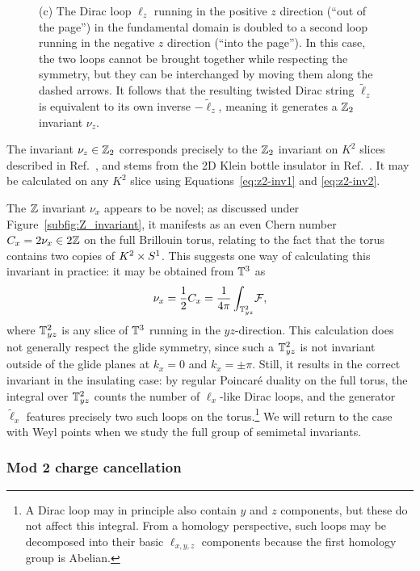 \begin{figure}[htb!]
{		(c) The Dirac loop $\ell_z$ running in the positive $z$ direction (``out of the page'') in the fundamental domain is doubled to a second loop running in the negative $z$ direction (``into the page''). In this case, the two loops cannot be brought together while respecting the symmetry, but they can be interchanged by moving them along the dashed arrows. It follows that the resulting twisted Dirac string $\tilde{\ell}_z$ is equivalent to its own inverse $-\tilde{\ell}_z$, meaning it generates a $\mathbb{Z}_2$ invariant $\nu_z$.}
	\label{fig:K2S1_invariants}
\end{figure}

The invariant $\nu_z\in\mathbb{Z}_2$ corresponds precisely to the $\mathbb{Z}_2$ invariant on $K^2$ slices described in Ref.~\cite{Fonseca-Vaidya_nonorientable}, and stems from the 2D Klein bottle insulator in Ref.~\cite{CYZ_Klein-gauge}. It may be calculated on any $K^2$ slice using Equations~\eqref{eq:z2-inv1} and \eqref{eq:z2-inv2}. 

The $\mathbb{Z}$ invariant $\nu_x$ appears to be novel; as discussed under Figure~\ref{subfig:Z_invariant}, it manifests as an even Chern number $C_x = 2\nu_x\in 2\mathbb{Z}$ on the full Brillouin torus, relating to the fact that the torus contains two copies of $K^2\times S^1$. This suggests one way of calculating this invariant in practice: it may be obtained from $\mathbb{T}^3$ as
\begin{equation}\label{eq:z-invariant1}
	\nu_x = \frac{1}{2}C_x = \frac{1}{4\pi}\int_{\mathbb{T}_{yz}^2}\!\mathcal{F},
\end{equation}
where $\mathbb{T}_{yz}^2$ is any slice of $\mathbb{T}^3$ running in the $yz$-direction. This calculation does not generally respect the glide symmetry, since such a $\mathbb{T}_{yz}^2$ is not invariant outside of the glide planes at $k_x=0$ and $k_x = \pm\pi$. Still, it results in the correct invariant in the insulating case: by regular Poincaré duality on the full torus, the integral over $\mathbb{T}_{yz}^2$ counts the number of $\ell_x$-like Dirac loops, and the generator $\tilde{\ell}_x$ features precisely two such loops on the torus.\footnote{
	A Dirac loop may in principle also contain $y$ and $z$ components, but these do not affect this integral. From a homology perspective, such loops may be decomposed into their basic $\ell_{x,y,z}$ components because the first homology group is Abelian.}
We will return to the case with Weyl points when we study the full group of semimetal invariants.

\subsubsection{Mod 2 charge cancellation}

